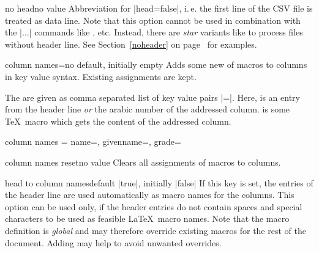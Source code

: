 \documentclass[a4paper,11pt]{ltxdoc}
\begin{document}
\begin{docCsvKey}{no head}{}{no value}
  Abbreviation for |head=false|, i.\,e. the first line of the CSV file is
  treated as data line.
  Note that this option cannot be used in combination with
  the |\csvauto...| commands like , etc.
  Instead, there are \emph{star} variants like  to
  process files without header line.
  See Section~\ref{noheader} on page~\pageref{noheader} for examples.
\end{docCsvKey}

\begin{docCsvKey}{column names}{=}{no default, initially empty}
  Adds some new  of macros to columns in key value syntax.
  Existing assignments are kept.\par
  The  are given as comma separated list of key value pairs
  \mbox{|=|}. Here,  is an entry from the
  header line \emph{or} the arabic number of the addressed column.
   is some \TeX\ macro which gets the content of the addressed column.
\begin{dispListing}
  column names = {name=\surname, givenname=\firstname, grade=\grade}
\end{dispListing}
\end{docCsvKey}


\begin{docCsvKey}{column names reset}{}{no value}
  Clears all assignments of macros to columns.
\end{docCsvKey}


\begin{docCsvKey}{head to column names}{}{default |true|, initially |false|}
  If this key is set, the entries of the header line are used automatically
  as macro names for the columns. This option can be used only, if
  the header entries do not contain spaces and special characters to be
  used as feasible \LaTeX\ macro names.
  Note that the macro definition is \emph{global} and may therefore override
  existing macros for the rest of the document. Adding
   may help to avoid unwanted
  overrides.
\end{docCsvKey}


\end{document}
